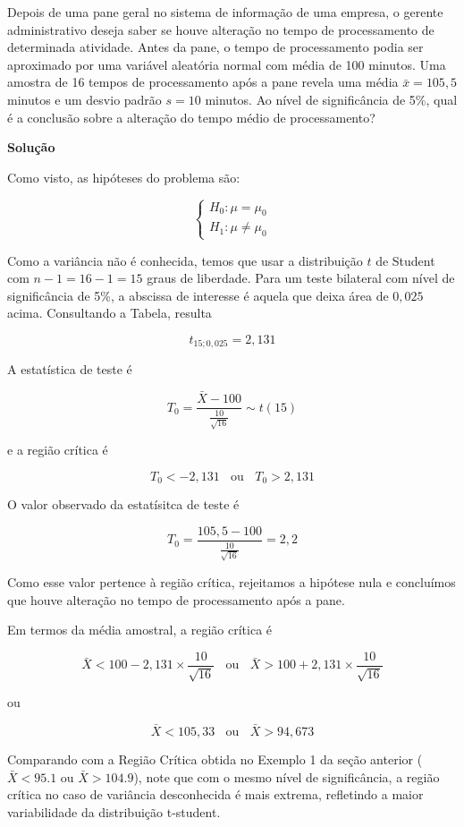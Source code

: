 \documentclass[
]{book}
\begin{document}
Depois de uma pane geral no sistema de informação de uma empresa, o gerente administrativo deseja saber se houve alteração no tempo de processamento de determinada atividade. Antes da pane, o tempo de processamento podia ser aproximado por uma variável aleatória normal com média de 100 minutos. Uma amostra de 16 tempos de processamento após a pane revela uma média \(\bar x = 105,5\) minutos e um desvio padrão \(s = 10\) minutos. Ao nível de significância de 5\%, qual é a conclusão sobre a alteração do tempo médio de processamento?

\textbf{Solução}

Como visto, as hipóteses do problema são:

\[
\begin{cases}
H_0:\mu=\mu_0 \\
H_1:\mu\ne\mu_0
\end{cases}
\]

Como a variância não é conhecida, temos que usar a distribuição \(t\) de Student com \(n-1=16-1=15\) graus de liberdade. Para um teste bilateral com nível de significância de 5\%, a abscissa de interesse é aquela que deixa área de \(0,025\) acima. Consultando a Tabela, resulta

\[t_{15;0,025}=2,131\]

A estatística de teste é

\[T_0=\frac{\bar X -100}{\frac{10}{\sqrt{16}}}\sim t(15)\]

e a região crítica é

\[T_0<-2,131~~~~\text{ou}~~~~T_0>2,131\]

O valor observado da estatísitca de teste é

\[T_0=\frac{105,5 -100}{\frac{10}{\sqrt{16}}}=2,2\]

Como esse valor pertence à região crítica, rejeitamos a hipótese nula e concluímos que houve alteração no tempo de processamento após a pane.

Em termos da média amostral, a região crítica é

\[\bar X<100-2,131\times\frac{10}{\sqrt{16}}~~~~\text{ou}~~~~\bar X>100+2,131\times\frac{10}{\sqrt{16}}\]

ou

\[\bar X<105,33~~~~\text{ou}~~~~\bar X>94,673\]

Comparando com a Região Crítica obtida no Exemplo 1 da seção anterior (\(\bar X < 95.1\text{ ou }\bar X > 104.9\)), note que com o mesmo nível de significância, a região crítica no caso de variância desconhecida é mais extrema, refletindo a maior variabilidade da distribuição t-student.
\end{document}
